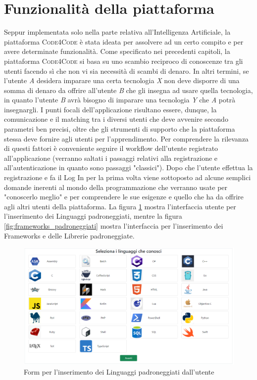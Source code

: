 \section{Funzionalità della piattaforma} %
Seppur implementata solo nella parte relativa all'Intelligenza Artificiale, la piattaforma \textsc{Code4Code} è stata ideata per assolvere ad un certo compito e per avere determinate funzionalità. Come specificato nei precedenti capitoli, la piattaforma \textsc{Code4Code} si basa su uno scambio reciproco di conoscenze tra gli utenti facendo sì che non vi sia necessità di scambi di denaro. In altri termini, se l’utente \emph{A} desidera imparare una certa tecnologia \emph{X} non deve disporre di una somma di denaro da offrire all’utente \emph{B} che gli insegna ad usare quella tecnologia, in quanto l’utente \emph{B} avrà bisogno di imparare una tecnologia \emph{Y} che \emph{A} potrà insegnargli.
I punti focali dell’applicazione risultano essere, dunque, la comunicazione e il matching tra i diversi utenti che deve avvenire secondo parametri ben precisi, oltre che gli strumenti di supporto che la piattaforma stessa deve fornire agli utenti per l’apprendimento. Per comprendere la rilevanza di questi fattori è conveniente seguire il workflow dell’utente registrato all’applicazione (verranno saltati i passaggi relativi alla registrazione e all’autenticazione in quanto sono passaggi "classici").
Dopo che l’utente effettua la registrazione e fa il Log In per la prima volta viene sottoposto ad alcune semplici domande inerenti al mondo della programmazione che verranno usate per "conoscerlo meglio" e per comprendere le sue esigenze e quello che ha da offrire agli altri utenti della piattaforma. La figura \ref{fig:linguaggi_padroneggiati} mostra l'interfaccia utente per l'inserimento dei Linguaggi padroneggiati, mentre la figura \ref{fig:frameworks_padroneggiati} mostra l'interfaccia per l'inserimento dei Frameworks e delle Librerie padroneggiate. 
\begin{figure}[!htb]
    \includegraphics[width=\textwidth]{capitoli/images/linguaggi_padroneggiati.png}
    \caption{Form per l'inserimento dei Linguaggi padroneggiati dall'utente}
    \label{fig:linguaggi_padroneggiati}
\end{figure}
